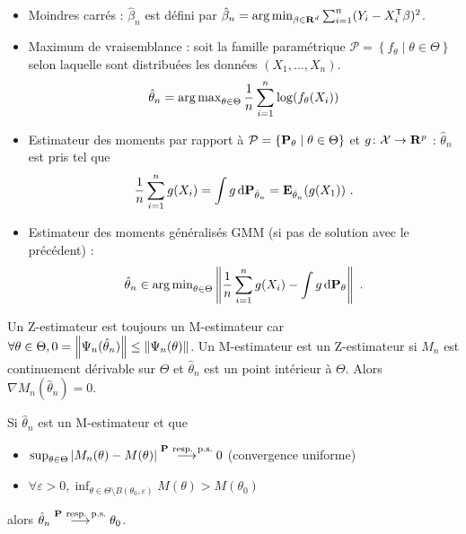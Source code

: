 	\begin{ex}
		\begin{itemize}
			\item[\textbullet] Moindres carrés : $\hat{\beta}_n$ est défini par $\hat{\beta}_n = \operatorname{arg\, min}_{\beta \in \mathbf{R}^d} \sum_{i = 1}^n (Y_i - X_i^\mathsf{T}\beta)^2$.
			\item[\textbullet] Maximum de vraisemblance : soit la famille paramétrique $\mathcal{P} = \left\{ f_{\theta} \mid \theta \in \Theta \right\}$ selon laquelle sont distribuées les données $(X_1,\ldots,X_n)$.
				$$\hat{\theta}_n = \operatorname{arg\, max}_{\theta \in \Theta} \frac{1}{n} \sum_{i = 1}^n \log(f_{\theta}(X_i))$$
			\item[\textbullet] Estimateur des moments par rapport à $\mathcal{P} = \left\{ \mathbf{P}_{\theta} \mid \theta \in \Theta \right\}$ et $g \colon \mathcal{X} \to \mathbf{R}^p$ : $\hat{\theta}_n$ est pris tel que
			$$\frac{1}{n} \sum_{i = 1}^n g(X_i) = \int g \mathop{}\mathopen{}\mathrm{d} \mathbf{P}_{\hat{\theta}_n} = \mathbf{E}_{\hat{\theta}_n}(g(X_1))\ .$$
			\item[\textbullet] Estimateur des moments généralisés GMM (si pas de solution avec le précédent) :
			$$\hat{\theta}_n \in \operatorname{arg\, min}_{\theta \in \Theta} \left\lVert \frac{1}{n}\sum_{i = 1}^n g(X_i) - \int g \mathop{}\mathopen{}\mathrm{d} \mathbf{P}_\theta \right\rVert\ .$$
		\end{itemize}
	\end{ex}

	\begin{rem}
		Un Z-estimateur est toujours un M-estimateur car $\forall \theta \in \Theta, 0 = \left\lVert\Psi_n(\hat{\theta}_n)\right\rVert \leq \left\lVert\Psi_n(\theta)\right\rVert$.
		Un M-estimateur est un Z-estimateur si $M_n$ est continuement dérivable sur $\Theta$ et $\hat{\theta}_n$ est un point intérieur à $\Theta$.
		Alors $\nabla M_n(\hat{\theta}_n) = 0$.
	\end{rem}

	\begin{pop}
		Si $\hat{\theta}_n$ est un M-estimateur et que
		\begin{itemize}
			\item[\textbullet] $\sup_{\theta \in \Theta} \left\lvert M_n(\theta) - M(\theta)\right\rvert \overset{\mathbf{P}\ \text{resp. p.s.}}{\longrightarrow} 0$ (convergence uniforme)
			\item[\textbullet] $\forall \varepsilon > 0, \inf_{\theta \in \Theta \setminus B(\theta_0,\varepsilon)} M(\theta) > M(\theta_0)$
		\end{itemize}
		alors $\hat{\theta}_n \overset{\proba\ \text{resp. p.s.}}{\longrightarrow} \theta_0$.
	\end{pop}

